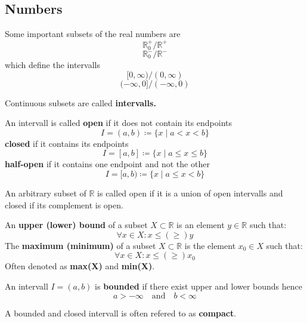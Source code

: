 \subsection{Numbers}

\begin{remark}
    Some important subsets of the real numbers are 
    $$\mathbb{R}^{+}_{0} / \mathbb{R}^{+}$$ 
    $$\mathbb{R}^{-}_{0} / \mathbb{R}^{-}$$ 
    which define the intervalls 
    $$[0, \infty) / (0, \infty)$$
    $$(-\infty, 0] / (-\infty, 0)$$
\end{remark}

\begin{definition}
    Continuous subsets are called \textbf{intervalls.}
\end{definition}

\begin{definition}
    An intervall is called
    \textbf{open} if it does not contain its endpoints 
    $$I = (a, b) \coloneqq \{x \mid a \lt x \lt b\}$$
    \textbf{closed} if it contains its endpoints 
    $$I = [a, b] \coloneqq \{x \mid a \leq x \leq b\}$$
    \textbf{half-open} if it contains one endpoint and not the other 
    $$I = [a, b) \coloneqq \{x \mid a \leq x \lt b\}$$
\end{definition}

\begin{remark}
    An arbitrary subset of $\mathbb{R}$ is called open if it is a union of open intervalls and closed if its complement is open.
\end{remark}

\begin{definition}
    An \textbf{upper (lower) bound} of a subset $X \subset \mathbb{R}$ is an element $y \in \mathbb{R}$ such that:
    $$\forall x \in X: x \leq (\geq) y$$
    The \textbf{maximum (minimum)} of a subset $X \subset \mathbb{R}$ is the element $x_{0} \in X$ such that:
    $$\forall x \in X: x \leq (\geq) x_{0}$$
    Often denoted as \textbf{max(X)} and \textbf{min(X)}.
\end{definition}

\begin{definition}
    An intervall $I = (a, b)$ is \textbf{bounded} if there exist upper and lower bounds hence 
    $$a > -\infty \quad \text{and} \quad b < \infty$$
\end{definition}

\begin{remark}
    A bounded and closed intervall is often refered to as \textbf{compact}.
\end{remark}

